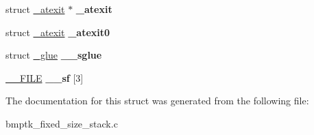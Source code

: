 \begin{DoxyCompactItemize}
\begin{tabbing}
\end{tabbing}\item 
struct \hyperlink{struct__atexit}{\+\_\+atexit} $\ast$ {\bfseries \+\_\+atexit}\hypertarget{struct__reent_ad96650c254abfeffd3e417d21215c3b3}{}\label{struct__reent_ad96650c254abfeffd3e417d21215c3b3}

\item 
struct \hyperlink{struct__atexit}{\+\_\+atexit} {\bfseries \+\_\+atexit0}\hypertarget{struct__reent_a824f2ece1a1954856ce9338976f4fb29}{}\label{struct__reent_a824f2ece1a1954856ce9338976f4fb29}

\item 
struct \hyperlink{struct__glue}{\+\_\+glue} {\bfseries \+\_\+\+\_\+sglue}\hypertarget{struct__reent_a30fe201b8c795e829146818bc943aee2}{}\label{struct__reent_a30fe201b8c795e829146818bc943aee2}

\item 
\hyperlink{struct____s_f_i_l_e}{\+\_\+\+\_\+\+F\+I\+LE} {\bfseries \+\_\+\+\_\+sf} \mbox{[}3\mbox{]}\hypertarget{struct__reent_ac461ce45c0325c5046bf7193ea0b3289}{}\label{struct__reent_ac461ce45c0325c5046bf7193ea0b3289}

\end{DoxyCompactItemize}


The documentation for this struct was generated from the following file\+:\begin{DoxyCompactItemize}
\item 
bmptk\+\_\+fixed\+\_\+size\+\_\+stack.\+c\end{DoxyCompactItemize}
